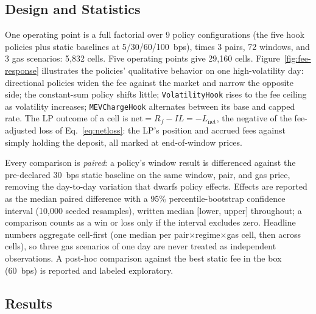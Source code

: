 \documentclass[a4paper,conference]{IEEEtran}
\begin{document}
\subsection{Design and Statistics}

One operating point is a full factorial over 9 policy configurations
(the five hook policies plus static baselines at 5/30/60/100~bps),
times 3 pairs, 72 windows, and 3 gas scenarios: 5{,}832 cells. Five
operating points give 29{,}160 cells.
Figure~\ref{fig:fee-response} illustrates the policies' qualitative
behavior on one high-volatility day: directional policies widen the
fee against the market and narrow the opposite side; the constant-sum
policy shifts little; \texttt{VolatilityHook} rises to the fee ceiling
as volatility increases; \texttt{MEVChargeHook} alternates between its
base and capped rate.
The LP outcome of a cell is
$\mathrm{net} = R_f - IL = -L_{\mathrm{net}}$, the negative of the
fee-adjusted loss of Eq.~\eqref{eq:netloss}: the LP's
position and accrued fees against simply holding the deposit, all
marked at end-of-window prices.

Every comparison is \emph{paired}: a policy's window result is
differenced against the pre-declared 30~bps static baseline on the same
window, pair, and gas price, removing the day-to-day variation that
dwarfs policy effects. Effects are reported as the median paired
difference with a 95\% percentile-bootstrap confidence interval
(10{,}000 seeded resamples), written median $[$lower, upper$]$
throughout; a comparison counts as a win or loss only
if the interval excludes zero. Headline
numbers aggregate cell-first (one median per pair$\times$regime$\times$gas
cell, then across cells), so three gas scenarios of one day are never
treated as independent observations.
A post-hoc comparison against the best static fee in the box (60~bps) is
reported and labeled exploratory.

\subsection{Results}
\end{document}
